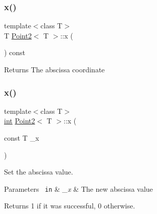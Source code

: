 \mbox{\label{class_point2_adbf149d6f50de0d91c714a3fc45a80c5}} 
\subsubsection{\texorpdfstring{x()}{x()}\hspace{0.1cm}{\footnotesize\ttfamily [1/2]}}
{\footnotesize\ttfamily template$<$class T$>$ \\
T \mbox{\hyperlink{class_point2}{Point2}}$<$ T $>$\+::x (\begin{DoxyParamCaption}{ }\end{DoxyParamCaption}) const\hspace{0.3cm}{\ttfamily [inline]}}

\begin{DoxyReturn}{Returns}
The abscissa coordinate 
\end{DoxyReturn}
\mbox{\label{class_point2_a3e62033b920c32928e71c6d357425761}} 
\subsubsection{\texorpdfstring{x()}{x()}\hspace{0.1cm}{\footnotesize\ttfamily [2/2]}}
{\footnotesize\ttfamily template$<$class T$>$ \\
\mbox{\hyperlink{draw_8hh_aa620a13339ac3a1177c86edc549fda9b}{int}} \mbox{\hyperlink{class_point2}{Point2}}$<$ T $>$\+::x (\begin{DoxyParamCaption}\item[{const T}]{\+\_\+x }\end{DoxyParamCaption})\hspace{0.3cm}{\ttfamily [inline]}}



Set the abscissa value. 


\begin{DoxyParams}[1]{Parameters}
\mbox{\texttt{ in}}  & {\em \+\_\+x} & The new abscissa value \\
\hline
\end{DoxyParams}
\begin{DoxyReturn}{Returns}
1 if it was successful, 0 otherwise. 
\end{DoxyReturn}
\mbox{\label{class_point2_ad7138ca15abc7937b9b1fdb0a84d229c}} 
